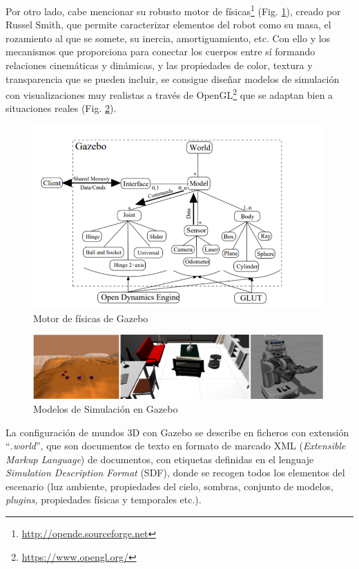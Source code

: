 Por otro lado, cabe mencionar su robusto motor de físicas\footnote{\url{http://opende.sourceforge.net}} (Fig. \ref{gazebo-physics}), creado por Russel Smith, que permite caracterizar elementos del robot como su masa, el rozamiento al que se somete, su inercia, amortiguamiento, etc. Con ello y los mecanismos que proporciona para conectar los cuerpos entre sí formando relaciones cinemáticas y dinámicas, y las propiedades de color, textura y transparencia que se pueden incluir, se consigue diseñar modelos de simulación con visualizaciones muy realistas a través de OpenGL\footnote{\url{https://www.opengl.org/}} que se adaptan bien a situaciones reales (Fig. \ref{gazebo-models}).

\begin{figure}[!hbtp]  \centering\noindent
    \includegraphics[width=0.99\textwidth]{figures/gazebo-engine.png}
    \caption{Motor de físicas de Gazebo}
    \label{gazebo-physics}
\end{figure}

\begin{figure}[!hbtp]  \centering\noindent
    \includegraphics[width=0.99\textwidth]{figures/gazebo-models.png}
    \caption{Modelos de Simulación en Gazebo}
    \label{gazebo-models}
\end{figure}
 
La configuración de mundos 3D con Gazebo se describe en ficheros con extensión ``\textit{.world}'', que son documentos de texto en formato de marcado XML (\textit{Extensible Markup Language}) de documentos, con etiquetas definidas en el lenguaje \textit{Simulation Description Format} (SDF), donde se
recogen todos los elementos del escenario (luz ambiente, propiedades del cielo, sombras, conjunto de modelos, \textit{plugins}, propiedades
físicas y temporales etc.).
 
